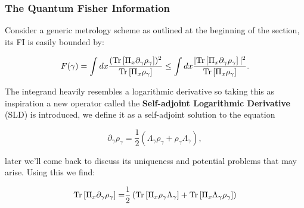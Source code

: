 \subsubsection{The Quantum Fisher Information}
Consider a generic metrology scheme as outlined at the beginning of
the section, its FI is easily bounded by:

\begin{equation}
  F(\gamma) = \int dx
  \frac{(\mathrm{Tr}\left[\Pi_{x}\partial_{\gamma}\rho_{\gamma}\right])^{2}}{\mathrm{Tr}\left[\Pi_{x}\rho_{\gamma}\right]} \leq \int dx
  \frac{|\mathrm{Tr}\left[\Pi_{x}\partial_{\gamma}\rho_{\gamma}\right]|^{2}}{\mathrm{Tr}\left[\Pi_{x}\rho_{\gamma}\right]}.
\end{equation}

The integrand heavily resembles a logarithmic derivative so taking
this as inspiration a new operator called the \textbf{Self-adjoint
  Logarithmic Derivative} (SLD) is introduced,  we define it as
a self-adjoint solution to the equation

\begin{equation}
  \partial_{\gamma}\rho_{\gamma} = \frac{1}{2}\left(\Lambda_{\gamma}\rho_{\gamma} + \rho_{\gamma}\Lambda_{\gamma} \right),
\end{equation}

later we'll come back to discuss its uniqueness and potential
problems that may arise. Using this we find:

\begin{align}
  \mathrm{Tr}\left[\Pi_{x}\partial_{\gamma}\rho_{\gamma}\right] =&\frac{1}{2}\left( \mathrm{Tr}\left[\Pi_{x}\rho_{\gamma}\Lambda_{\gamma}\right] +\mathrm{Tr}\left[\Pi_{x}\Lambda_{\gamma}\rho_{\gamma}\right]\right)\\
\end{align}
